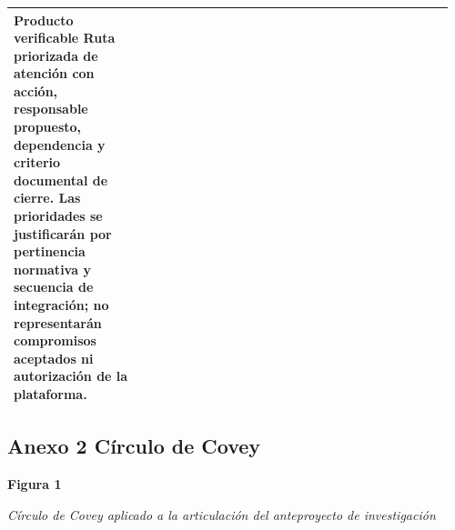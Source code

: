 {\begin{landscape}
\begin{longtable}{@{}p{0.28\linewidth}p{0.68\linewidth}@{}}
Producto verificable
Ruta priorizada de atención con acción, responsable propuesto, dependencia y criterio documental de cierre. Las prioridades se justificarán por pertinencia normativa y secuencia de integración; no representarán compromisos aceptados ni autorización de la plataforma.\\
\bottomrule\end{longtable}
\endgroup
\end{landscape}
\clearpage
\pagestyle{fancy}

\clearpage
\pagestyle{empty}
\begin{landscape}
\section*{Anexo 2 Círculo de Covey}

\noindent\textbf{Figura 1}\par
\textit{Círculo de Covey aplicado a la articulación del anteproyecto de investigación}\par\vspace{2mm}

\circulodecovey[0.64]

\par\vspace{2mm}
\end{landscape}
\clearpage
\pagestyle{fancy}
}




